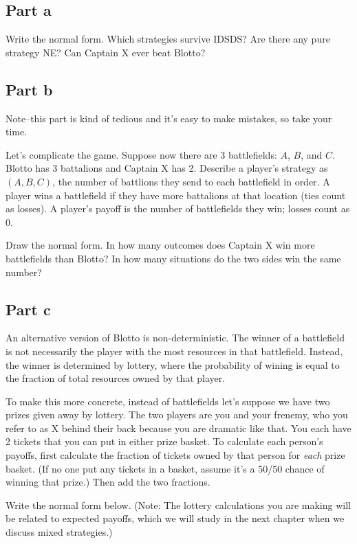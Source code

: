 \documentclass[10pt]{article}
\begin{document}
\subsection*{Part a} Write the normal form. Which strategies survive IDSDS? Are there any pure strategy NE? Can Captain X ever beat Blotto?

\newpage

\subsection*{Part b} Note--this part is kind of tedious and it's easy to make mistakes, so take your time.

Let's complicate the game. Suppose now there are 3 battlefields: $A$, $B$, and $C$. Blotto has 3 battalions and Captain X has 2. Describe a player's strategy as $(A,B,C)$, the number of battlions they send to each battlefield in order. A player wins a battlefield if they have more battalions at that location (ties count as losses). A player's payoff is the number of battlefields they win; losses count as 0.

Draw the normal form. In how many outcomes does Captain X win more battlefields than Blotto? In how many situations do the two sides win the same number?

\newpage

\subsection*{Part c} An alternative version of Blotto is non-deterministic. The winner of a battlefield is not necessarily the player with the most resources in that battlefield. Instead, the winner is determined by lottery, where the probability of wining is equal to the fraction of total resources owned by that player.

To make this more concrete, instead of battlefields let's suppose we have two prizes given away by lottery. The two players are you and your frenemy, who you refer to as X behind their back because you are dramatic like that. You each have 2 tickets that you can put in either prize basket. To calculate each person's payoffs, first calculate the fraction of tickets owned by that person for \emph{each} prize basket. (If no one put any tickets in a basket, assume it's a 50/50 chance of winning that prize.) Then add the two fractions.

Write the normal form below. (Note: The lottery calculations you are making will be related to expected payoffs, which we will study in the next chapter when we discuss mixed strategies.)
\end{document}

